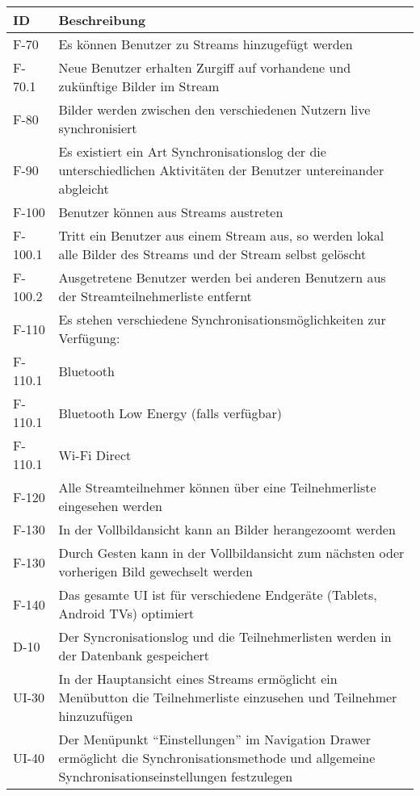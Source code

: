 \begin{center}
\begin{longtable}{|l|p{12cm}|}
\toprule
\textbf{ID} & \textbf{Beschreibung} \\
\hline
\endhead
\hline
\endfoot
F-70 & Es können Benutzer zu Streams hinzugefügt werden\\
F-70.1 & Neue Benutzer erhalten Zurgiff auf vorhandene und zukünftige Bilder im Stream\\
F-80 & Bilder werden zwischen den verschiedenen Nutzern live synchronisiert\\
F-90 & Es existiert ein Art Synchronisationslog der die unterschiedlichen Aktivitäten der Benutzer untereinander abgleicht\\
F-100 & Benutzer können aus Streams austreten \\
F-100.1 & Tritt ein Benutzer aus einem Stream aus, so werden lokal alle Bilder des Streams und der Stream selbst gelöscht\\
F-100.2 & Ausgetretene Benutzer werden bei anderen Benutzern aus der Streamteilnehmerliste entfernt\\
F-110 & Es stehen verschiedene Synchronisationsmöglichkeiten zur Verfügung:\\
F-110.1 & Bluetooth\\
F-110.1 & Bluetooth Low Energy (falls verfügbar)\\
F-110.1 & Wi-Fi Direct\\
F-120 & Alle Streamteilnehmer können über eine Teilnehmerliste eingesehen werden\\
F-130 & In der Vollbildansicht kann an Bilder herangezoomt werden\\
F-130 & Durch Gesten kann in der Vollbildansicht zum nächsten oder vorherigen Bild gewechselt werden\\
F-140 & Das gesamte UI ist für verschiedene Endgeräte (Tablets, Android TVs) optimiert\\
\hline
D-10 & Der Syncronisationslog und die Teilnehmerlisten werden in der Datenbank gespeichert\\
\hline
UI-30 & In der Hauptansicht eines Streams ermöglicht ein Menübutton die Teilnehmerliste einzusehen und Teilnehmer hinzuzufügen\\
UI-40 & Der Menüpunkt \enquote{Einstellungen} im Navigation Drawer ermöglicht die Synchronisationsmethode und allgemeine Synchronisationseinstellungen festzulegen\\
\end{longtable}
\end{center}